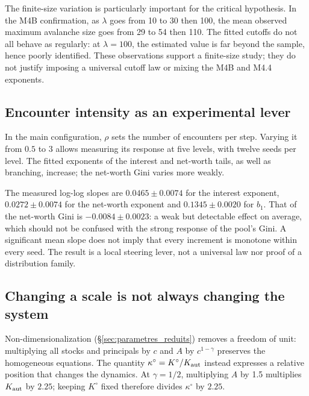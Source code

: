 The finite-size variation is particularly important for the critical
hypothesis. In the M4B confirmation, as $\lambda$ goes from 10 to 30
then 100, the mean observed maximum avalanche size goes from 29 to 54
then 110. The fitted cutoffs do not all behave as regularly: at
$\lambda=100$, the estimated value is far beyond the sample, hence
poorly identified. These observations support a finite-size study; they
do not justify imposing a universal cutoff law or mixing the M4B and
M4.4 exponents.

\subsection{Encounter intensity as an experimental lever}
In the main configuration, $\rho$ sets the number of encounters per
step. Varying it from $0.5$ to $3$ allows measuring its response at
five levels, with twelve seeds per level. The fitted exponents of the
interest and net-worth tails, as well as branching, increase; the
net-worth Gini varies more weakly.


The measured log-log slopes are $0.0465\pm0.0074$ for the interest
exponent, $0.0272\pm0.0074$ for the net-worth exponent and
$0.1345\pm0.0020$ for $b_1$. That of the net-worth Gini is
$-0.0084\pm0.0023$: a weak but detectable effect on average, which
should not be confused with the strong response of the pool's Gini. A
significant mean slope does not imply that every increment is monotone
within every seed. The result is a local steering lever, not a
universal law nor proof of a distribution family.

\subsection{Changing a scale is not always changing the system}
Non-dimensionalization (\S\ref{sec:parametres_reduits}) removes a
freedom of unit: multiplying all stocks and principals by $c$ and $A$
by $c^{1-\gamma}$ preserves the homogeneous equations. The quantity
$\kappa^\circ=K^\circ/K_{\rm aut}$ instead expresses a relative position
that changes the dynamics. At $\gamma=1/2$, multiplying $A$ by 1.5
multiplies $K_{\rm aut}$ by $2.25$; keeping $K^\circ$ fixed therefore
divides $\kappa^\circ$ by $2.25$.

